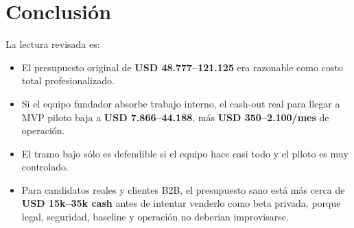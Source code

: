 \documentclass[11pt,a4paper]{article}
\begin{document}
\section{Conclusión}
La lectura revisada es:
\begin{itemize}
  \item El presupuesto original de \textbf{USD 48.777--121.125} era razonable como costo total profesionalizado.
  \item Si el equipo fundador absorbe trabajo interno, el cash-out real para llegar a MVP piloto baja a \textbf{USD 7.866--44.188}, más \textbf{USD 350--2.100/mes} de operación.
  \item El tramo bajo sólo es defendible si el equipo hace casi todo y el piloto es muy controlado.
  \item Para candidatos reales y clientes B2B, el presupuesto sano está más cerca de \textbf{USD 15k--35k cash} antes de intentar venderlo como beta privada, porque legal, seguridad, baseline y operación no deberían improvisarse.
\end{itemize}
\end{document}
